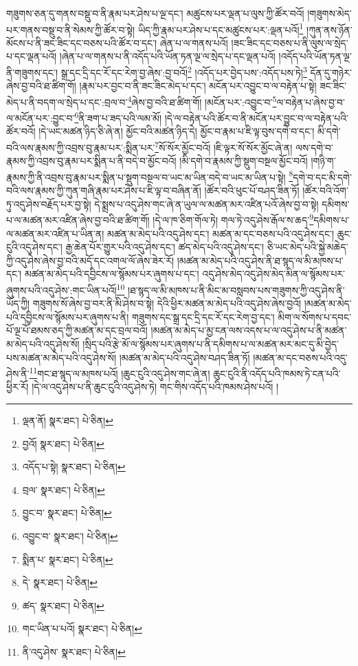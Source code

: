 གཟུགས་ཅན་དུ་གནས་བསྡུ་བ་ནི་རྣམ་པར་ཤེས་པ་ལྔ་དང་། མཚུངས་པར་ལྡན་པ་ལུས་ཀྱི་ཚོར་བའོ། །གཟུགས་མེད་པར་གནས་བསྡུ་བ་ནི་སེམས་ཀྱི་ཚོར་བ་སྟེ། ཡིད་ཀྱི་རྣམ་པར་ཤེས་པ་དང་མཚུངས་པར་:ལྡན་པའོ།\footnote{ལྡན་ནོ།  སྣར་ཐང་།  པེ་ཅིན། } །ཀུན་ནས་ཉོན་མོངས་པ་ནི་ཟང་ཟིང་དང་བཅས་པའི་ཚོར་བ་དང་། ཞེན་པ་ལ་གནས་པའོ། །ཟང་ཟིང་དང་བཅས་པ་ནི་ལུས་ལ་སྲེད་པ་དང་ལྡན་པའོ། །ཞེན་པ་ལ་གནས་པ་ནི་འདོད་པའི་ཡོན་ཏན་ལྔ་ལ་སྲེད་པ་དང་ལྡན་པའོ། །འདོད་པའི་ཡོན་ཏན་ལྔ་ནི་གཟུགས་དང་། སྒྲ་དང་དྲི་དང་རོ་དང་རེག་བྱ་ཞེས་:བྱ་བའོ།\footnote{བྱའོ།  སྣར་ཐང་།  པེ་ཅིན། } །འདོད་པར་བྱེད་པས་:འདོད་པས་ཏེ།\footnote{འདོད་པ་སྟེ།  སྣར་ཐང་།  པེ་ཅིན། } དོན་དུ་གཉེར་ཞེས་བྱ་བའི་ཐ་ཚིག་གོ། །རྣམ་པར་བྱང་བ་ནི་ཟང་ཟིང་མེད་པ་དང་། མངོན་པར་འབྱུང་བ་ལ་བརྟེན་པ་སྟེ། ཟང་ཟིང་མེད་པ་ནི་བདག་ལ་སྲེད་པ་དང་:བྲལ་བ་\footnote{བྲལ་  སྣར་ཐང་།  པེ་ཅིན། }ཞེས་བྱ་བའི་ཐ་ཚིག་གོ། །མངོན་པར་:འབྱུང་བ་\footnote{བྱུང་བ་  སྣར་ཐང་།  པེ་ཅིན། }ལ་བརྟེན་པ་ཞེས་བྱ་བ་ལ་མངོན་པར་:བྱུང་བ་\footnote{འབྱུང་བ་  སྣར་ཐང་།  པེ་ཅིན། }ནི་ཟག་པ་ཟད་པའི་ལམ་མོ། །དེ་ལ་བརྟེན་པའི་ཚོར་བ་ནི་མངོན་པར་བྱུང་བ་ལ་བརྟེན་པའི་ཚོར་བའོ། །དེ་ཡང་མཚན་ཉིད་ཅི་ཞེ་ན། མྱོང་བའི་མཚན་ཉིད་དེ། མྱོང་བ་རྣམ་པ་ཇི་ལྟ་བུས་དགེ་བ་དང་། མི་དགེ་བའི་ལས་རྣམས་ཀྱི་འབྲས་བུ་རྣམ་པར་:སྨིན་པར་\footnote{སྨིན་པ་  སྣར་ཐང་།  པེ་ཅིན། }སོ་སོར་མྱོང་བའོ། །ཇི་ལྟར་སོ་སོར་མྱོང་ཞེ་ན། ལས་དགེ་བ་རྣམས་ཀྱི་འབྲས་བུ་རྣམ་པར་སྨིན་པ་ནི་བདེ་བ་མྱོང་བའོ། །མི་དགེ་བ་རྣམས་ཀྱི་སྡུག་བསྔལ་མྱོང་བའོ། །གཉི་ག་རྣམས་ཀྱི་ནི་འབྲས་བུ་རྣམ་པར་སྨིན་པ་སྡུག་བསྔལ་བ་ཡང་མ་ཡིན་བདེ་བ་ཡང་མ་ཡིན་པ་སྟེ། \footnote{དེ་  སྣར་ཐང་།  པེ་ཅིན། }དགེ་བ་དང་མི་དགེ་བའི་ལས་རྣམས་ཀྱི་ཀུན་གཞི་རྣམ་པར་ཤེས་པ་ཇི་ལྟ་བ་བཞིན་ནོ། །ཚོར་བའི་ཕུང་པོ་བཤད་ཟིན་ཏོ། །ཚོར་བའི་འོག་ཏུ་འདུ་ཤེས་བརྗོད་པར་བྱ་སྟེ། དེ་སྨྲས་པ་འདུ་ཤེས་གང་ཞེ་ན་ཡུལ་ལ་མཚན་མར་འཛིན་པའོ་ཞེས་བྱ་བ་སྟེ། དམིགས་པ་ལ་མཚན་མར་འཛིན་ཞེས་བྱ་བའི་ཐ་ཚིག་གོ། །དེ་ལ་ཁ་ཅིག་གོལ་ཏེ། གལ་ཏེ་འདུ་ཤེས་རྒོལ་ས་ཆད་\footnote{ཚད་  སྣར་ཐང་།  པེ་ཅིན། }དམིགས་པ་ལ་མཚན་མར་འཛིན་པ་ཡིན་ན། མཚན་མ་མེད་པའི་འདུ་ཤེས་དང་། མཚན་མ་དང་བཅས་པའི་འདུ་ཤེས་དང་། ཆུང་ངུའི་འདུ་ཤེས་དང་། རྒྱ་ཆེན་པོར་གྱུར་པའི་འདུ་ཤེས་དང་། ཚད་མེད་པའི་འདུ་ཤེས་དང་། ཅི་ཡང་མེད་པའི་སྐྱེ་མཆེད་ཀྱི་འདུ་ཤེས་ཞེས་བྱ་བའི་མདོ་དང་འགལ་ལོ་ཞེས་ཟེར་རོ། །མཚན་མ་མེད་པའི་འདུ་ཤེས་ནི་ཐ་སྙད་ལ་མི་མཁས་པ་དང་། མཚན་མ་མེད་པའི་དབྱིངས་ལ་སྙོམས་པར་ཞུགས་པ་དང་། འདུ་ཤེས་མེད་འདུ་ཤེས་མེད་མིན་ལ་སྙོམས་པར་ཞུགས་པའི་འདུ་ཤེས་:གང་ཡིན་པའོ།\footnote{གང་ཡིན་པ་པའོ།  སྣར་ཐང་།  པེ་ཅིན། } །ཐ་སྙད་ལ་མི་མཁས་པ་ནི་མིང་མ་བསླབས་པས་གཟུགས་ཀྱི་འདུ་ཤེས་ནི་ཡོད་ཀྱི། གཟུགས་སོ་ཞེས་བྱ་བར་ནི་མི་ཤེས་བ་སྟེ། དེའི་ཕྱིར་མཚན་མ་མེད་པའི་འདུ་ཤེས་ཞེས་བྱའོ། །མཚན་མ་མེད་པའི་དབྱིངས་ལ་སྙོམས་པར་ཞུགས་པ་ནི། གཟུགས་དང་སྒྲ་དང་དྲི་དང་རོ་དང་རེག་བྱ་དང་། མིག་ལ་སོགས་པ་དབང་པོ་ལྔ་པོ་ཐམས་ཅད་ཀྱི་མཚན་མ་དང་བྲལ་བའོ། །མཚན་མ་མེད་པ་མྱ་ངན་ལས་འདས་པ་ལ་འདུ་ཤེས་པ་ནི་མཚན་མ་མེད་པའི་འདུ་ཤེས་སོ། །སྲིད་པའི་རྩེ་མོ་ལ་སྙོམས་པར་ཞུགས་པ་ནི་དམིགས་པ་ལ་མཚན་མར་མང་དུ་མི་བྱེད་པས་མཚན་མ་མེད་པའི་འདུ་ཤེས་སོ། །མཚན་མ་མེད་པའི་འདུ་ཤེས་བཤད་ཟིན་ཏོ། །མཚན་མ་དང་བཅས་པའི་འདུ་ཤེས་ནི་\footnote{ནི་འདུ་ཤེས་  སྣར་ཐང་།  པེ་ཅིན། }གང་ཐ་སྙད་ལ་མཁས་པའོ། །ཆུང་ངུའི་འདུ་ཤེས་གང་ཞེ་ན། ཆུང་ངུའི་ནི་འདོད་པའི་ཁམས་ཏེ་ངན་པའི་ཕྱིར་རོ། །དེ་ལ་འདུ་ཤེས་པ་ནི་ཆུང་ངུའི་འདུ་ཤེས་ཏེ། གང་གིས་འདོད་པའི་ཁམས་ཤེས་པའོ། །
